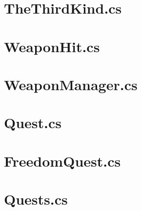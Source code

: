 \section{TheThirdKind.cs}


\section{WeaponHit.cs}


\section{WeaponManager.cs}


\section{Quest.cs}


\section{FreedomQuest.cs}



\section{Quests.cs}


